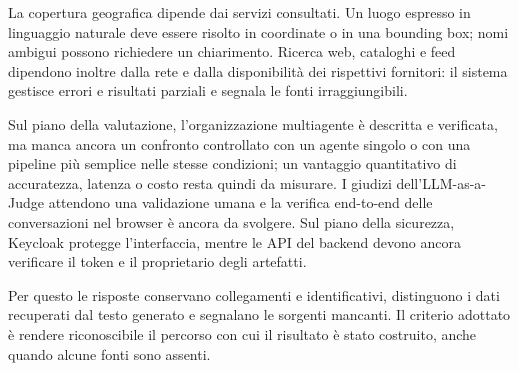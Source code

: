 La copertura geografica dipende dai servizi consultati. Un luogo espresso in
linguaggio naturale deve essere risolto in coordinate o in una bounding box;
nomi ambigui possono richiedere un chiarimento. Ricerca web, cataloghi e feed
dipendono inoltre dalla rete e dalla disponibilità dei rispettivi fornitori: il
sistema gestisce errori e risultati parziali e segnala le fonti irraggiungibili.

Sul piano della valutazione, l'organizzazione multiagente è descritta e
verificata, ma manca ancora un confronto controllato con un agente singolo o
con una pipeline più semplice nelle stesse condizioni; un vantaggio
quantitativo di accuratezza, latenza o costo resta quindi da misurare. I
giudizi dell'LLM-as-a-Judge attendono una validazione umana e la verifica
end-to-end delle conversazioni nel browser è ancora da svolgere. Sul piano della
sicurezza, Keycloak protegge l'interfaccia, mentre le API del backend devono
ancora verificare il token e il proprietario degli artefatti.

Per questo le risposte conservano collegamenti e identificativi, distinguono i
dati recuperati dal testo generato e segnalano le sorgenti mancanti. Il criterio
adottato è rendere riconoscibile il percorso con cui il risultato è stato
costruito, anche quando alcune fonti sono assenti.
